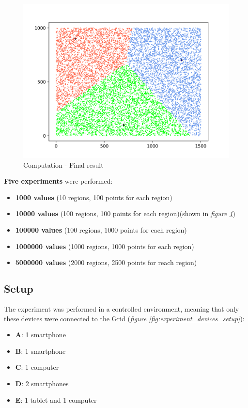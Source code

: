 \begin{figure}[!ht]
    \centering
    \includegraphics[width=\linewidth]{document/chapters/chapter_7/images/computation_final_result.png}
    \caption{Computation - Final result}
    \label{fig:computation_final_result}
\end{figure}

\textbf{Five experiments} were performed:
\begin{itemize}
    \item \textbf{1000 values} (10 regions, 100 points for each region)
    \item \textbf{10000 values} (100 regions, 100 points for each region)(shown in \textit{figure \ref{fig:computation_final_result}})
    \item \textbf{100000 values} (100 regions, 1000 points for each region)
    \item \textbf{1000000 values} (1000 regions, 1000 points for each region)
    \item \textbf{5000000 values} (2000 regions, 2500 points for reach region)
\end{itemize}

\subsection{Setup}
The experiment was performed in a controlled environment, meaning that only these devices were connected to the Grid (\textit{figure \ref{fig:experiment_devices_setup}}):
\begin{itemize}
    \item \textbf{A}: 1 smartphone
    \item \textbf{B}: 1 smartphone
    \item \textbf{C}: 1 computer
    \item \textbf{D}: 2 smartphones
    \item \textbf{E}: 1 tablet and 1 computer
\end{itemize}

